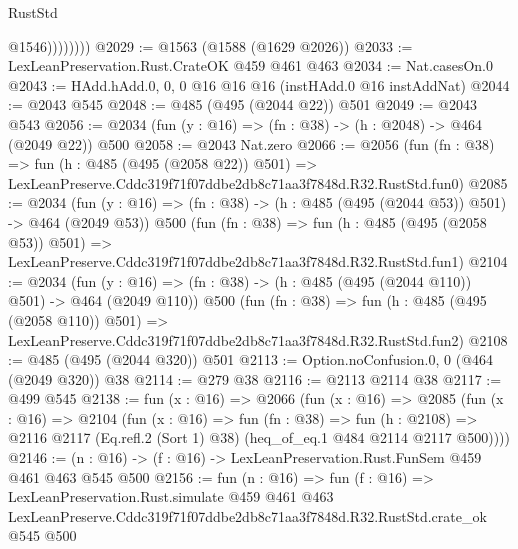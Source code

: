 \begin{lexlean}{RustStd}
\begin{coremodule}
                    @1546))))))))
@2029 := @1563 (@1588 (@1629 @2026))
@2033 := LexLeanPreservation.Rust.CrateOK @459 @461 @463
@2034 := Nat.casesOn.{0}
@2043 := HAdd.hAdd.{0, 0, 0} @16 @16 @16 (instHAdd.{0} @16 instAddNat)
@2044 := @2043 @545
@2048 := @485 (@495 (@2044 @22)) @501
@2049 := @2043 @543
@2056 := @2034 (fun (y : @16) => (fn : @38) -> (h : @2048) -> @464 (@2049 @22)) @500
@2058 := @2043 Nat.zero
@2066 := @2056
    (fun (fn : @38) =>
    fun (h : @485 (@495 (@2058 @22)) @501) =>
    LexLeanPreserve.Cddc319f71f07ddbe2db8c71aa3f7848d.R32.RustStd.fun0)
@2085 := @2034
    (fun (y : @16) => (fn : @38) -> (h : @485 (@495 (@2044 @53)) @501) -> @464 (@2049 @53))
    @500
    (fun (fn : @38) =>
    fun (h : @485 (@495 (@2058 @53)) @501) =>
    LexLeanPreserve.Cddc319f71f07ddbe2db8c71aa3f7848d.R32.RustStd.fun1)
@2104 := @2034
    (fun (y : @16) => (fn : @38) -> (h : @485 (@495 (@2044 @110)) @501) -> @464 (@2049 @110))
    @500
    (fun (fn : @38) =>
    fun (h : @485 (@495 (@2058 @110)) @501) =>
    LexLeanPreserve.Cddc319f71f07ddbe2db8c71aa3f7848d.R32.RustStd.fun2)
@2108 := @485 (@495 (@2044 @320)) @501
@2113 := Option.noConfusion.{0, 0} (@464 (@2049 @320)) @38
@2114 := @279 @38
@2116 := @2113 @2114 @38
@2117 := @499 @545
@2138 := fun (x : @16) =>
  @2066
    (fun (x : @16) =>
    @2085
      (fun (x : @16) =>
      @2104
        (fun (x : @16) =>
        fun (fn : @38) =>
        fun (h : @2108) =>
        @2116 @2117 (Eq.refl.{2} (Sort 1) @38) (heq_of_eq.{1} @484 @2114 @2117 @500))))
@2146 := (n : @16) -> (f : @16) -> LexLeanPreservation.Rust.FunSem @459 @461 @463 @545 @500
@2156 := fun (n : @16) =>
  fun (f : @16) =>
  LexLeanPreservation.Rust.simulate
    @459
    @461
    @463
    LexLeanPreserve.Cddc319f71f07ddbe2db8c71aa3f7848d.R32.RustStd.crate_ok
    @545
    @500
\end{coremodule}
\end{lexlean}
